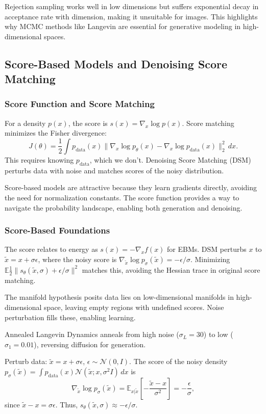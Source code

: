 \documentclass[a4paper,12pt]{article}
\begin{document}
Rejection sampling works well in low dimensions but suffers exponential decay in acceptance rate with dimension, making it unsuitable for images. This highlights why MCMC methods like Langevin are essential for generative modeling in high-dimensional spaces.

\subsection{Score-Based Models and Denoising Score Matching}
\subsubsection{Score Function and Score Matching}
For a density $p(x)$, the score is $s(x) = \nabla_x \log p(x)$. Score matching minimizes the Fisher divergence:
\begin{equation}
    J(\theta) = \frac{1}{2} \int p_{\text{data}}(x) \|\nabla_x \log p_\theta(x) - \nabla_x \log p_{\text{data}}(x)\|_2^2 \, dx.
\end{equation}
This requires knowing $p_{\text{data}}$, which we don't. Denoising Score Matching (DSM) perturbs data with noise and matches scores of the noisy distribution.

Score-based models are attractive because they learn gradients directly, avoiding the need for normalization constants. The score function provides a way to navigate the probability landscape, enabling both generation and denoising.

\subsubsection{Score-Based Foundations}
The score relates to energy as $s(x) = -\nabla_x f(x)$ for EBMs. DSM perturbs $x$ to $\tilde{x} = x + \sigma \epsilon$, where the noisy score is $\nabla_{\tilde{x}} \log p_\sigma(\tilde{x}) = -\epsilon / \sigma$. Minimizing $\mathbb{E} \frac{1}{2} \| s_\theta(\tilde{x}, \sigma) + \epsilon / \sigma \|^2$ matches this, avoiding the Hessian trace in original score matching.

The manifold hypothesis posits data lies on low-dimensional manifolds in high-dimensional space, leaving empty regions with undefined scores. Noise perturbation fills these, enabling learning.

Annealed Langevin Dynamics anneals from high noise ($\sigma_L = 30$) to low ($\sigma_1 = 0.01$), reversing diffusion for generation.

Perturb data: $\tilde{x} = x + \sigma \epsilon$, $\epsilon \sim \mathcal{N}(0,I)$. The score of the noisy density $p_\sigma(\tilde{x}) = \int p_{\text{data}}(x) \mathcal{N}(\tilde{x}; x, \sigma^2 I) \, dx$ is
\begin{equation}
    \nabla_{\tilde{x}} \log p_\sigma(\tilde{x}) = \mathbb{E}_{x|\tilde{x}} \left[ -\frac{\tilde{x} - x}{\sigma^2} \right] = -\frac{\epsilon}{\sigma},
\end{equation}
since $\tilde{x} - x = \sigma \epsilon$. Thus, $s_\theta(\tilde{x}, \sigma) \approx -\epsilon / \sigma$.
\end{document}
